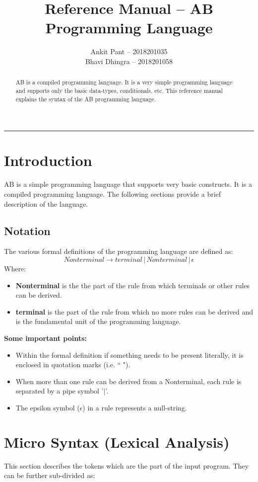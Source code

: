 \documentclass[12pt, a4paper]{article}
\title{\Large{Reference Manual -- AB Programming Language}}
\author{Ankit Pant -- 2018201035 \\ Bhavi Dhingra -- 2018201058}
\date{}
\begin{document}
	\maketitle
	\noindent\rule{\textwidth}{1pt}
	\newpage
	
	\begin{abstract}
		AB is a compiled programming language. It is a very simple programming language and supports only the basic data-types, conditionals, etc. This reference manual  explains the syntax of the AB programming language.
	\end{abstract}
	\newpage
	\tableofcontents
	\newpage
	\section{Introduction}
		AB is a simple programming language that supports very basic constructs. It is a compiled programming language. The following sections provide a brief description of the language.
		
		\subsection{Notation}
			The various formal definitions of the programming language are defined as:
			$$ Nonterminal \to terminal \,|\,  Nonterminal \,|\, \epsilon $$
			Where: 
			\begin{itemize}
				\item \textbf{Nonterminal} is the the part of the rule from which terminals or other rules can be derived.
				\item\textbf{terminal} is the part of the rule from which no more rules can be derived and is the fundamental unit of the programming language.
			\end{itemize}
		\textbf{Some important points:}
		\begin{itemize}
			\item Within the formal definition if something needs to be present literally, it is enclosed in quotation marks (i.e. `` ").
			\item When more than one rule can be derived from a Nonterminal, each rule is separated by a pipe symbol '$|$'. 
			\item The epsilon symbol ($\epsilon$) in a rule represents a null-string. \\
		\end{itemize}
	\section[Micro-Syntax]{Micro Syntax (Lexical Analysis)}
		This section describes the tokens which are the part of the input program. They can be further sub-divided as:
\end{document}
